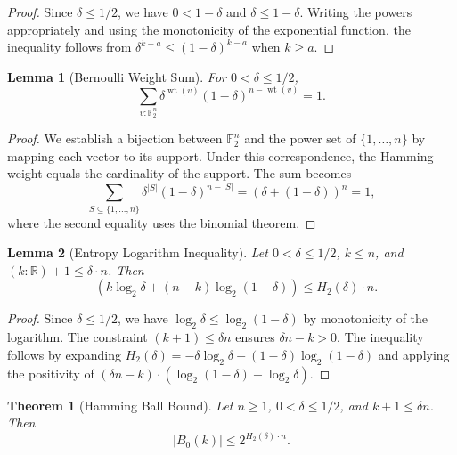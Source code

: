 \documentclass[11pt]{article}
\theoremstyle{plain}
\newtheorem*{theorem}{Theorem}
\newtheorem*{lemma}{Lemma}
\theoremstyle{definition}
\theoremstyle{remark}
\begin{document}
\begin{proof}
Since $\delta \leq 1/2$, we have $0 < 1 - \delta$ and $\delta \leq 1 - \delta$. Writing the powers appropriately and using the monotonicity of the exponential function, the inequality follows from $\delta^{k-a} \leq (1-\delta)^{k-a}$ when $k \geq a$.
\end{proof}

\begin{lemma}[Bernoulli Weight Sum]
For $0 < \delta \leq 1/2$,
\[
\sum_{v : \mathbb{F}_2^n} \delta^{\operatorname{wt}(v)} (1-\delta)^{n - \operatorname{wt}(v)} = 1.
\]
\end{lemma}

\begin{proof}
We establish a bijection between $\mathbb{F}_2^n$ and the power set of $\{1, \ldots, n\}$ by mapping each vector to its support. Under this correspondence, the Hamming weight equals the cardinality of the support. The sum becomes
\[
\sum_{S \subseteq \{1,\ldots,n\}} \delta^{|S|}(1-\delta)^{n-|S|} = (\delta + (1-\delta))^n = 1,
\]
where the second equality uses the binomial theorem.
\end{proof}

\begin{lemma}[Entropy Logarithm Inequality]
Let $0 < \delta \leq 1/2$, $k \leq n$, and $(k : \mathbb{R}) + 1 \leq \delta \cdot n$. Then
\[
-(k \log_2 \delta + (n - k)\log_2(1-\delta)) \leq H_2(\delta) \cdot n.
\]
\end{lemma}

\begin{proof}
Since $\delta \leq 1/2$, we have $\log_2 \delta \leq \log_2(1-\delta)$ by monotonicity of the logarithm. The constraint $(k+1) \leq \delta n$ ensures $\delta n - k > 0$. The inequality follows by expanding $H_2(\delta) = -\delta\log_2\delta - (1-\delta)\log_2(1-\delta)$ and applying the positivity of $(\delta n - k) \cdot (\log_2(1-\delta) - \log_2\delta)$.
\end{proof}

\begin{theorem}[Hamming Ball Bound]
Let $n \geq 1$, $0 < \delta \leq 1/2$, and $k + 1 \leq \delta n$. Then
\[
|B_0(k)| \leq 2^{H_2(\delta) \cdot n}.
\]
\end{theorem}
\end{document}
